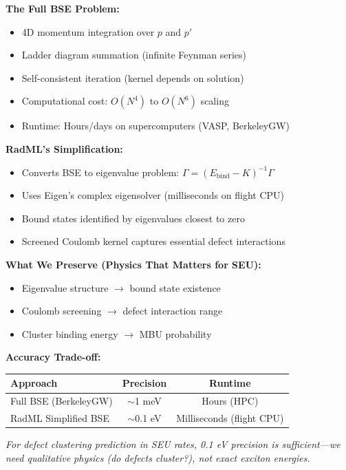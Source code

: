 \documentclass[11pt,a4paper]{article}
\begin{document}
\begin{tcolorbox}[colback=yellow!5!white,colframe=yellow!50!black,title=Design Rationale: Why Simplified BSE?]
\textbf{The Full BSE Problem:}
\begin{itemize}[noitemsep,topsep=0pt]
    \item 4D momentum integration over $p$ and $p'$
    \item Ladder diagram summation (infinite Feynman series)
    \item Self-consistent iteration (kernel depends on solution)
    \item Computational cost: $O(N^4)$ to $O(N^6)$ scaling
    \item Runtime: Hours/days on supercomputers (VASP, BerkeleyGW)
\end{itemize}

\vspace{0.3em}
\textbf{RadML's Simplification:}
\begin{itemize}[noitemsep,topsep=0pt]
    \item Converts BSE to eigenvalue problem: $\Gamma = (E_{\text{bind}} - K)^{-1} \Gamma$
    \item Uses Eigen's complex eigensolver (milliseconds on flight CPU)
    \item Bound states identified by eigenvalues closest to zero
    \item Screened Coulomb kernel captures essential defect interactions
\end{itemize}

\vspace{0.3em}
\textbf{What We Preserve (Physics That Matters for SEU):}
\begin{itemize}[noitemsep,topsep=0pt]
    \item Eigenvalue structure $\to$ bound state existence
    \item Coulomb screening $\to$ defect interaction range
    \item Cluster binding energy $\to$ MBU probability
\end{itemize}

\vspace{0.3em}
\textbf{Accuracy Trade-off:}
\begin{center}
\begin{tabular}{@{}lcc@{}}
\toprule
\textbf{Approach} & \textbf{Precision} & \textbf{Runtime} \\
\midrule
Full BSE (BerkeleyGW) & $\sim$1 meV & Hours (HPC) \\
RadML Simplified BSE & $\sim$0.1 eV & Milliseconds (flight CPU) \\
\bottomrule
\end{tabular}
\end{center}

\textit{For defect clustering prediction in SEU rates, 0.1 eV precision is sufficient---we need qualitative physics (do defects cluster?), not exact exciton energies.}
\end{tcolorbox}
\end{document}
